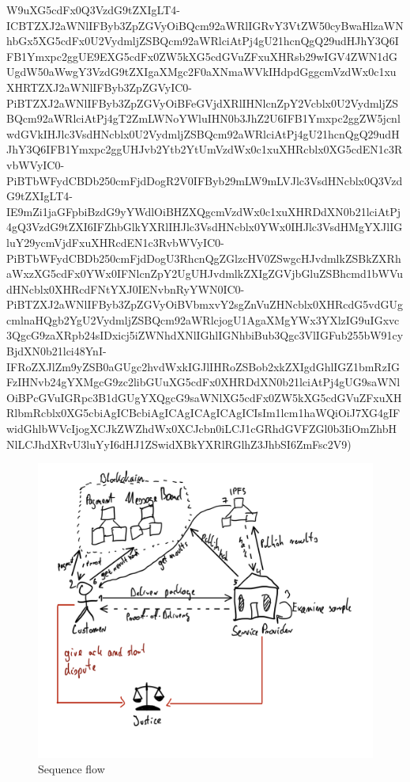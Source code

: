 \documentclass{article}
\begin{document}
W9uXG5cdFx0Q3VzdG9tZXIgLT4-ICBTZXJ2aWNlIFByb3ZpZGVyOiBQcm92aWRlIGRvY3VtZW50cyBwaHlzaWNhbGx5XG5cdFx0U2VydmljZSBQcm92aWRlciAtPj4gU21hcnQgQ29udHJhY3Q6IFB1Ymxpc2ggUE9EXG5cdFx0ZW5kXG5cdGVuZFxuXHRsb29wIGV4ZWN1dGUgdW50aWwgY3VzdG9tZXIgaXMgc2F0aXNmaWVkIHdpdGggcmVzdWx0c1xuXHRTZXJ2aWNlIFByb3ZpZGVyIC0-PiBTZXJ2aWNlIFByb3ZpZGVyOiBFeGVjdXRlIHNlcnZpY2Vcblx0U2VydmljZSBQcm92aWRlciAtPj4gT2ZmLWNoYWluIHN0b3JhZ2U6IFB1Ymxpc2ggZW5jcnlwdGVkIHJlc3VsdHNcblx0U2VydmljZSBQcm92aWRlciAtPj4gU21hcnQgQ29udHJhY3Q6IFB1Ymxpc2ggUHJvb2Ytb2YtUmVzdWx0c1xuXHRcblx0XG5cdEN1c3RvbWVyIC0-PiBTbWFydCBDb250cmFjdDogR2V0IFByb29mLW9mLVJlc3VsdHNcblx0Q3VzdG9tZXIgLT4-IE9mZi1jaGFpbiBzdG9yYWdlOiBHZXQgcmVzdWx0c1xuXHRDdXN0b21lciAtPj4gQ3VzdG9tZXI6IFZhbGlkYXRlIHJlc3VsdHNcblx0YWx0IHJlc3VsdHMgYXJlIGluY29ycmVjdFxuXHRcdEN1c3RvbWVyIC0-PiBTbWFydCBDb250cmFjdDogU3RhcnQgZGlzcHV0ZSwgcHJvdmlkZSBkZXRhaWxzXG5cdFx0YWx0IFNlcnZpY2UgUHJvdmlkZXIgZGVjbGluZSBhcmd1bWVudHNcblx0XHRcdFNtYXJ0IENvbnRyYWN0IC0-PiBTZXJ2aWNlIFByb3ZpZGVyOiBVbmxvY2sgZnVuZHNcblx0XHRcdG5vdGUgcmlnaHQgb2YgU2VydmljZSBQcm92aWRlcjogU1AgaXMgYWx3YXlzIG9uIGxvc3QgcG9zaXRpb24sIDxicj5iZWNhdXNlIGhlIGNhbiBub3Qgc3VlIGFub255bW91cyBjdXN0b21lci48YnI-IFRoZXJlZm9yZSB0aGUgc2hvdWxkIGJlIHRoZSBob2xkZXIgdGhlIGZ1bmRzIGFzIHNvb24gYXMgcG9zc2libGUuXG5cdFx0XHRDdXN0b21lciAtPj4gUG9saWNlOiBPcGVuIGRpc3B1dGUgYXQgcG9saWNlXG5cdFx0ZW5kXG5cdGVuZFxuXHRlbmRcblx0XG5cbiAgICBcbiAgICAgICAgICAgICIsIm1lcm1haWQiOiJ7XG4gIFwidGhlbWVcIjogXCJkZWZhdWx0XCJcbn0iLCJ1cGRhdGVFZGl0b3IiOmZhbHNlLCJhdXRvU3luYyI6dHJ1ZSwidXBkYXRlRGlhZ3JhbSI6ZmFsc2V9)
\begin{figure}[htbp]
\centerline{\includegraphics[width=\linewidth]{anonymous-service-provision.png}}
\caption{Sequence flow}
\label{fig:sequence-flow}
\end{figure}
\end{document}
